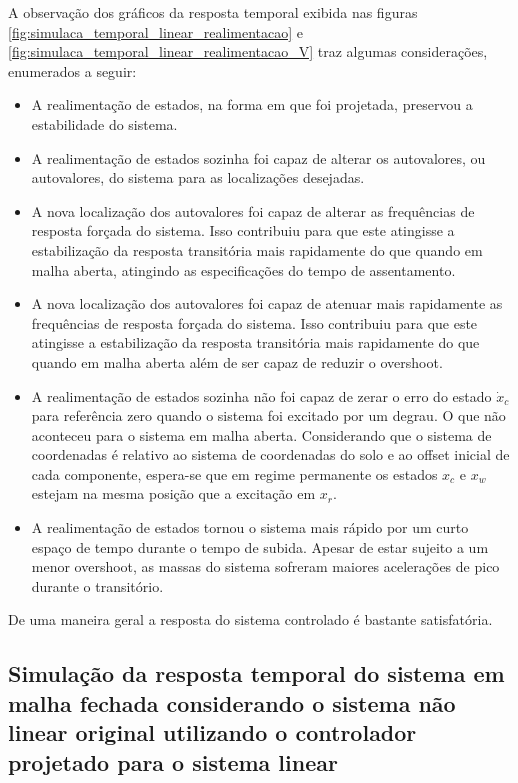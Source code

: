 \documentclass[a4paper]{ifacconf}
\begin{document}
    A observação dos gráficos da resposta temporal exibida nas figuras \ref{fig:simulaca_temporal_linear_realimentacao} e \ref{fig:simulaca_temporal_linear_realimentacao_V} traz algumas considerações, enumerados a seguir:
    
    \begin{itemize}
        \item A realimentação de estados, na forma em que foi projetada, preservou a estabilidade do sistema.
        \item A realimentação de estados sozinha foi capaz de alterar os autovalores, ou autovalores, do sistema para as localizações desejadas.
        \item A nova localização dos autovalores foi capaz de alterar as frequências de resposta forçada do sistema. Isso contribuiu para que este atingisse a estabilização da resposta transitória mais rapidamente do que quando em malha aberta, atingindo as especificações do tempo de assentamento.
        \item A nova localização dos autovalores foi capaz de atenuar mais rapidamente as frequências de resposta forçada do sistema. Isso contribuiu para que este atingisse a estabilização da resposta transitória mais rapidamente do que quando em malha aberta além de ser capaz de reduzir o overshoot.
        \item A realimentação de estados sozinha não foi capaz de zerar o erro do estado $\dot{x}_c$ para referência zero quando o sistema foi excitado por um degrau. O que não aconteceu para o sistema em malha aberta. Considerando que o sistema de coordenadas é relativo ao sistema de coordenadas do solo e ao offset inicial de cada componente, espera-se que em regime permanente os estados $x_c$ e $x_w$ estejam na mesma posição que a excitação em $x_r$.
        \item A realimentação de estados tornou o sistema mais rápido por um curto espaço de tempo durante o tempo de subida. Apesar de estar sujeito a um menor overshoot, as massas do sistema sofreram maiores acelerações de pico durante o transitório.
    \end{itemize}
    
    De uma maneira geral a resposta do sistema controlado é bastante satisfatória.
    
        \subsection{Simulação da resposta temporal do sistema em malha fechada considerando o sistema não linear original utilizando o controlador projetado para o sistema linear}
    
\end{document}
